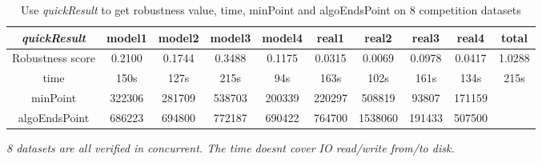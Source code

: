 \documentclass{article}
\begin{document}
	\begin{table}[!htbp]
	\begin{adjustwidth}{-1cm}{}		
		\begin{threeparttable}		
			\centering
			\caption{ Use \textit{quickResult} to get robustness value, time, minPoint and algoEndsPoint on 8 competition datasets }
			\label{tab:table17}
			\begin{tabular}{|c|c|c|c|c|c|c|c|c|c|}
				\hline		
				
				\textit{quickResult}        & \textbf{model1} & \textbf{model2} & \textbf{model3} & \textbf{model4} & \textbf{real1} & \textbf{real2} & \textbf{real3} & \textbf{real4} & \textbf{total} \\ \hline
				Robustness score & 0.2100          & 0.1744          & 0.3488          & 0.1175          & 0.0315         & 0.0069         & 0.0978         & 0.0417         & 1.0288         \\ \hline
				time             & 150s            & 127s            & 215s            & 94s             & 163s           & 102s           & 161s           & 134s           & 215s           \\ \hline
				minPoint         & 322306          & 281709          & 538703          & 200339          & 220297         & 508819         & 93807          & 171159         &                \\ \hline
				algoEndsPoint    & 686223          & 694800          & 772187          & 690422          & 764700         & 1538060        & 191433         & 507500         &                \\ \hline

			\end{tabular}
			\begin{tablenotes}
				\small
				\item\textit{ 8 datasets are all verified in concurrent. The time doesn\textquotesingle t cover IO read/write from/to disk.}
			\end{tablenotes}			
		\end{threeparttable}
	\end{adjustwidth}	
	\end{table}		
	
	
	
	
	
	



	
	
	
	
	
	
	
	
\end{document}
